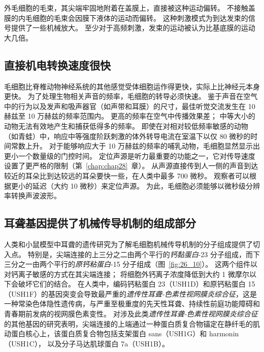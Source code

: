 外毛细胞的毛束，其尖端牢固地附着在盖膜上，直接被这种运动偏转。
不接触盖膜的内毛细胞的毛束会因膜下液体的运动而偏转。
这种刺激模式为到达发束的信号提供了一些机械放大。
至少对于高频刺激，发束的运动被认为比基底膜的运动大几倍。



\subsection{直接机电转换速度很快}

毛细胞比脊椎动物神经系统的其他感觉受体细胞运作得更快，实际上比神经元本身更快。
为了处理生物相关声音的频率，毛细胞的转导必须快速。 
鉴于声音在空气中的行为以及发声和吸声器官（如声带和耳膜）的尺寸，最佳听觉交流发生在 10 赫兹至 10 万赫兹的频率范围内。
更高的频率在空气中传播效果差；
中等大小的动物无法有效地产生和捕获低得多的频率。
即使在对相对较低频率敏感的动物（如青蛙）中，响应中等强度阶跃刺激的体外转导电流在室温下以仅 80 微秒的时间常数上升。
对于能够响应大于 10 万赫兹的频率的哺乳动物，毛细胞显然显示出更小一个数量级的门控时间。
定位声源是听力最重要的功能之一，它对传导速度设置了更严格的限制（第~\ref{chap:chap28}~章）。
从声源直接传到人一侧的声音到达较近的耳朵比到达较远的耳朵要快一些，在人类中最多 700 微秒。
观察者可以根据更小的延迟（大约 10 微秒）来定位声源。
为此，毛细胞必须能够以微秒级分辨率转换声波波形。



\subsection{耳聋基因提供了机械传导机制的组成部分}

人类和小鼠模型中耳聋的遗传研究为了解毛细胞机械传导机制的分子组成提供了切入点。
特别是，尖端连接的上三分之二由两个平行的\textit{钙黏蛋白}-23 分子组成，而下三分之一由两个平行的\textit{原钙粘蛋白}-15 分子组成（图~\ref{fig:26_10}）。
这两个组件以对钙离子敏感的方式在其尖端连接；
将细胞外钙离子浓度降低到大约 1 微摩尔以下会破坏它们的结合。
在人类中，编码钙粘蛋白 23（USH1D）和原钙粘蛋白 15（USH1F）的基因突变会导致最严重的\textit{遗传性耳聋-色素性视网膜炎综合征}，这是一种常染色体隐性遗传病，与严重至极重度的先天性耳聋、持续性前庭功能障碍和 青春期前发病的视网膜色素变性。
对涉及此类\textit{遗传性耳聋-色素性视网膜炎综合征}的其他基因的研究表明，尖端连接的上端通过一种蛋白质复合物锚定在静纤毛的肌动蛋白核心上，该蛋白质复合物包括支架蛋白 sans（USH1G）和 harmonin（USH1C）， 以及分子马达肌球蛋白 7a（USH1B）。



